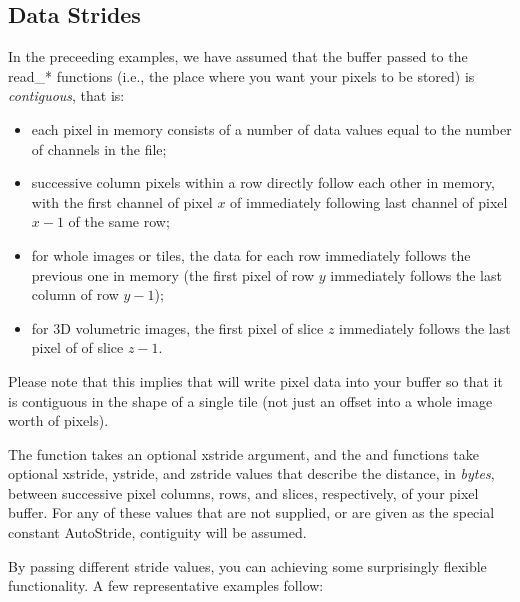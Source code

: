 

\subsection{Data Strides}
\label{sec:imageinput:strides}

In the preceeding examples, we have assumed that the buffer passed to
the {\cf read_*} functions (i.e., the place where you want your pixels
to be stored) is \emph{contiguous}, that is:

\begin{itemize}
\item each pixel in memory consists of a number of data values equal to
  the number of channels in the file;
\item successive column pixels within a row directly follow each other in
  memory, with the first channel of pixel $x$ of immediately following
  last channel of pixel $x-1$ of the same row;
\item for whole images or tiles, the data for each row
  immediately follows the previous one in memory (the first pixel of row
  $y$ immediately follows the last column of row $y-1$);
\item for 3D volumetric images, the first pixel of slice $z$ immediately
  follows the last pixel of of slice $z-1$.
\end{itemize}

Please note that this implies that \readtile will write pixel data into
your buffer so that it is contiguous in the shape of a single tile (not
just an offset into a whole image worth of pixels).

The \readscanline function takes an optional {\cf xstride} argument, and
the \readimage and \readtile functions take optional {\cf xstride}, 
{\cf ystride}, and {\cf zstride} values that describe the distance, in
\emph{bytes}, between successive pixel columns, rows, and slices,
respectively, of your pixel buffer.  For any of these values that are
not supplied, or are given as the special constant {\cf AutoStride},
contiguity will be assumed.

By passing different stride values, you can achieving some surprisingly
flexible functionality.  A few representative examples follow:


